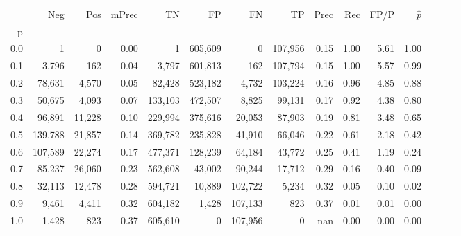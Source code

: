 \begin{tabular}{rrrrrrrrrrrrrrr}
\toprule
{} &      Neg &     Pos & mPrec &       TN &       FP &       FN &       TP &  Prec &   Rec &  FP/P & $\hat{p}$ \\
p   &          &         &       &          &          &          &          &       &       &       &           \\
\midrule
0.0 &        1 &       0 &  0.00 &        1 &  605,609 &        0 &  107,956 &  0.15 &  1.00 &  5.61 &      1.00 \\
0.1 &    3,796 &     162 &  0.04 &    3,797 &  601,813 &      162 &  107,794 &  0.15 &  1.00 &  5.57 &      0.99 \\
0.2 &   78,631 &   4,570 &  0.05 &   82,428 &  523,182 &    4,732 &  103,224 &  0.16 &  0.96 &  4.85 &      0.88 \\
0.3 &   50,675 &   4,093 &  0.07 &  133,103 &  472,507 &    8,825 &   99,131 &  0.17 &  0.92 &  4.38 &      0.80 \\
0.4 &   96,891 &  11,228 &  0.10 &  229,994 &  375,616 &   20,053 &   87,903 &  0.19 &  0.81 &  3.48 &      0.65 \\
0.5 &  139,788 &  21,857 &  0.14 &  369,782 &  235,828 &   41,910 &   66,046 &  0.22 &  0.61 &  2.18 &      0.42 \\
0.6 &  107,589 &  22,274 &  0.17 &  477,371 &  128,239 &   64,184 &   43,772 &  0.25 &  0.41 &  1.19 &      0.24 \\
0.7 &   85,237 &  26,060 &  0.23 &  562,608 &   43,002 &   90,244 &   17,712 &  0.29 &  0.16 &  0.40 &      0.09 \\
0.8 &   32,113 &  12,478 &  0.28 &  594,721 &   10,889 &  102,722 &    5,234 &  0.32 &  0.05 &  0.10 &      0.02 \\
0.9 &    9,461 &   4,411 &  0.32 &  604,182 &    1,428 &  107,133 &      823 &  0.37 &  0.01 &  0.01 &      0.00 \\
1.0 &    1,428 &     823 &  0.37 &  605,610 &        0 &  107,956 &        0 &   nan &  0.00 &  0.00 &      0.00 \\
\bottomrule
\end{tabular}
